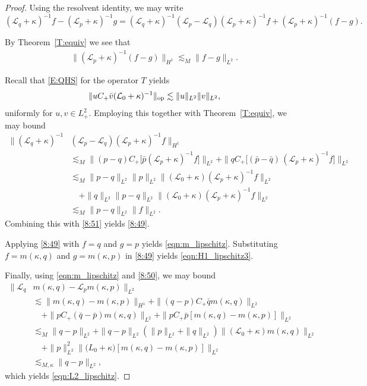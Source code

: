 \documentclass{amsart}
\numberwithin{equation}{section}
\theoremstyle{definition}
\newcommand{\ka}{\kappa}
\newcommand{\Lc}{\mathcal{L}}
\newcommand{\op}{\text{\upshape op}}
\begin{document}
\begin{proof}
Using the resolvent identity, we may write
\begin{equation*}
(\Lc_q+\ka)^{-1}f-(\Lc_p+\ka)^{-1}g=(\Lc_q+\ka)^{-1}(\Lc_p-\Lc_q)(\Lc_p+\ka)^{-1}f+(\Lc_p+\ka)^{-1}(f-g).
\end{equation*}

By Theorem~\ref{T:equiv} we see that
\begin{align}\label{8:51}
\|(\Lc_p+\ka)^{-1}(f-g)\|_{H^1}\lesssim_M\|f-g\|_{L^2}.
\end{align}

Recall that \eqref{E:QHS} for the operator $T$ yields
\begin{align}\label{8:50}
\|uC_+\bar v (\mathcal L_0+\ka)^{-1}\|_{\op}\lesssim \|u\|_{L^2} \|v\|_{L^2},
\end{align}
uniformly for $u,v\in L^2_+$. Employing this together with Theorem~\ref{T:equiv}, we may bound
\begin{align*}
\|(\Lc_q+\ka)^{-1}&(\Lc_p-\Lc_q)(\Lc_p+\ka)^{-1}f\|_{H^1}\\
&\lesssim_M \|(p-q) C_+\bigl[\bar{p}(\Lc_p+\ka)^{-1}f\bigr]\|_{L^2}+\|q C_+\bigl[(\bar{p}-\bar{q})\,(\Lc_p+\ka)^{-1}f\bigr]\|_{L^2}\\
&\lesssim_M \|p-q\|_{L^2}\|p\|_{L^2}\|(\mathcal L_0+\ka)(\Lc_p+\ka)^{-1}f\|_{L^2}\\
&\quad +\|q\|_{L^2}\|p-q\|_{L^2}\|(\mathcal L_0+\ka)(\Lc_p+\ka)^{-1}f\|_{L^2}\\
&\lesssim_M \|p-q\|_{L^2}\|f\|_{L^2}.
\end{align*}
Combining this with \eqref{8:51} yields \eqref{8:49}.

Applying \eqref{8:49} with $f=q$ and $g=p$ yields \eqref{eqn:m_lipschitz}.  Substituting $f=m(\ka,q)$ and $g=m(\ka,p)$ in \eqref{8:49} yields \eqref{eqn:H1_lipschitz3}.

Finally, using \eqref{eqn:m_lipschitz} and \eqref{8:50}, we may bound
\begin{align*}
\|\Lc_q &m(\ka,q)-\Lc_p m(\ka,p)\|_{L^2}\\
&\lesssim \|m(\ka,q) - m(\ka,p)\|_{H^1} + \|(q-p)C_+ \bar q m(\ka, q)\|_{L^2} \\
&\quad + \|pC_+ (\bar q-\bar p) m(\ka, q)\|_{L^2} +\|pC_+ \bar p [m(\ka, q)-m(\ka,p)]\|_{L^2} \\
&\lesssim_M \|q-p\|_{L^2} + \|q-p\|_{L^2}(\|p\|_{L^2}+\|q\|_{L^2})\|(\mathcal L_0+\ka)m(\ka,q)\|_{L^2}\\
&\quad +\|p\|_{L^2}^2\|\mathcal (L_0+\ka)[m(\ka,q)-m(\ka,p)]\|_{L^2}\\
&\lesssim_{M,\ka}  \|q-p\|_{L^2},
\end{align*}
which yields \eqref{eqn:L2_lipschitz}.
\end{proof}
\end{document}
